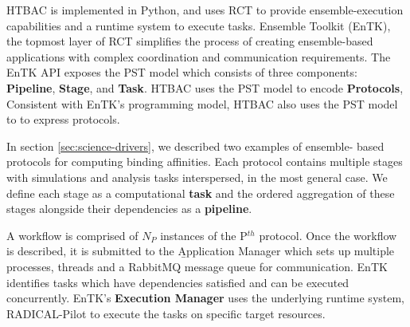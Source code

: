 






HTBAC is implemented in Python, and uses RCT to provide ensemble-execution
capabilities and a runtime system to execute tasks. Ensemble Toolkit (EnTK),
the topmost layer of RCT simplifies the process of creating ensemble-based
applications with complex coordination and communication requirements. The
EnTK API exposes the PST model which consists of three components:
\textbf{Pipeline}, \textbf{Stage}, and \textbf{Task}. HTBAC uses the PST model
to encode \textbf{Protocols}, Consistent with EnTK's programming model, HTBAC
also uses the PST model to to express  protocols.


In section \ref{sec:science-drivers}, we described two examples of ensemble-
based protocols for computing binding affinities. Each protocol contains
multiple stages with simulations and analysis tasks interspersed, in the most
general case. We define each stage as a computational \textbf{task} and the
ordered aggregation of these stages alongside their dependencies as a
\textbf{pipeline}.


A workflow is comprised of $N_P$ instances of the P$^{th}$ protocol. Once the
workflow is described, it is submitted to the
\b{Application Manager} which sets up multiple processes, threads and a
RabbitMQ message queue for communication. EnTK identifies tasks which have
dependencies satisfied and can be executed concurrently. EnTK's
\textbf{Execution Manager} uses the underlying runtime system, RADICAL-Pilot
to execute the tasks on specific target resources.

